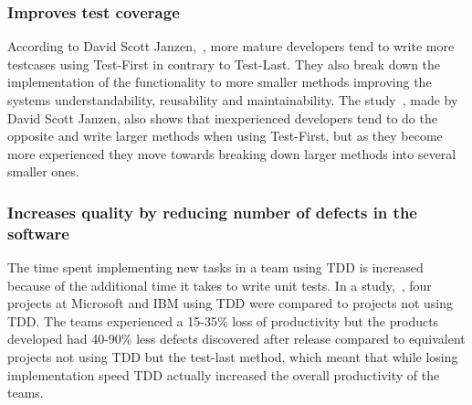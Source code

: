\subsubsection*{Improves test coverage}
According to David Scott Janzen,~\cite{janzen}, more mature developers tend to write more testcases using Test-First in contrary to Test-Last. They also break down the implementation of the functionality to more smaller methods improving the systems understandability, reusability and maintainability. The study~\cite{janzen}, made by David Scott Janzen, also shows that inexperienced developers tend to do the opposite and write larger methods when using Test-First, but as they become more experienced they move towards breaking down larger methods into several smaller ones.

\subsubsection*{Increases quality by reducing number of defects in the software}
The time spent implementing new tasks in a team using TDD is increased because of the additional time it takes to write unit tests. In a study,~\cite{microsoftibm}, four projects at Microsoft and IBM using TDD were compared to projects not using TDD. The teams experienced a 15-35\% loss of productivity but the products developed had 40-90\% less defects discovered after release compared to equivalent projects not using TDD but the test-last method, which meant that while losing implementation speed TDD actually increased the overall productivity of the teams. 
  
%
%




